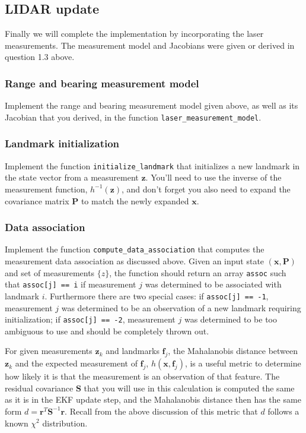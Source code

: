 \documentclass{article}
\newcommand{\mat}[1]{\bm{#1}}
\begin{document}
\subsection{LIDAR update}

Finally we will complete the implementation by incorporating the laser measurements.
The measurement model and Jacobians were given or derived in question 1.3 above.

\subsubsection{Range and bearing measurement model}
Implement the range and bearing measurement model given above, as well as its Jacobian that you derived, in the function \texttt{laser\_measurement\_model}.

\subsubsection{Landmark initialization}
Implement the function \texttt{initialize\_landmark} that initializes a new landmark in the state vector from a measurement $\mat{z}$.
You'll need to use the inverse of the measurement function, $h^{-1}(\mat{z})$, and don't forget you also need to expand the covariance matrix $\mat{P}$ to match the newly expanded $\mat{x}$.

\subsubsection{Data association}
Implement the function \texttt{compute\_data\_association} that computes the measurement data association as discussed above.
Given an input state $(\mat{x}, \mat{P})$ and set of measurements $\{z\}$, the function should return an array \texttt{assoc} such that \texttt{assoc[j] == i} if measurement $j$ was determined to be associated with landmark $i$.
Furthermore there are two special cases: if \texttt{assoc[j] == -1}, measurement $j$ was determined to be an observation of a new landmark requiring initialization; if \texttt{assoc[j] == -2}, measurement $j$ was determined to be too ambiguous to use and should be completely thrown out.

For given measurements $\mat{z}_k$ and landmarks $\mat{f}_j$, the Mahalanobis distance between $\mat{z}_k$ and the expected measurement of $\mat{f}_j$, $h(\mat{x}, \mat{f}_j)$, is a useful metric to determine how likely it is that the measurement is an observation of that feature.
The residual covariance $\mat{S}$ that you will use in this calculation is computed the same as it is in the EKF update step, and the Mahalanobis distance then has the same form $d = \mat{r}^T \mat{S}^{-1} \mat{r}$. 
Recall from the above discussion of this metric that $d$ follows a known $\chi^2$ distribution.
\end{document}
